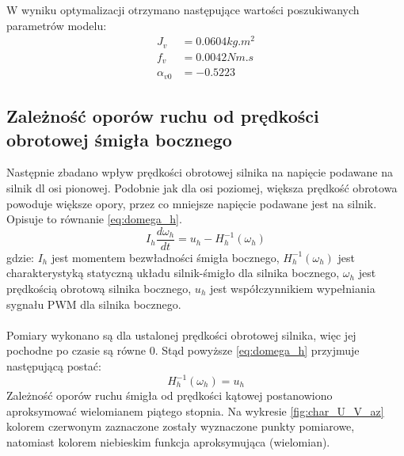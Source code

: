 \documentclass[11pt,a4paper]{article}
\begin{document}
W wyniku optymalizacji otrzymano następujące wartości poszukiwanych parametrów modelu:
\begin{equation}
\begin{aligned}
J_v &= 0.0604\si{kg.m^2}\\
f_v &= 0.0042\si{Nm.s}\\
\alpha_{v0} &= -0.5223
\end{aligned}
\end{equation}

\subsection{Zależność oporów ruchu od prędkości obrotowej śmigła bocznego}
Następnie zbadano wpływ prędkości obrotowej silnika na napięcie podawane na silnik dl osi pionowej. Podobnie jak dla osi poziomej, większa prędkość obrotowa powoduje większe opory, przez co mniejsze napięcie podawane jest na silnik. Opisuje to równanie \eqref{eq:domega_h}.
\begin{equation}
I_h\frac{d\omega_h}{dt} = u_h - H_h^{-1}(\omega_h)
\label{eq:domega_h}
\end{equation}
\noindent gdzie:\newline
\(I_h\) jest momentem bezwładności śmigła bocznego,\newline
\(H_h^{-1}(\omega_h)\) jest charakterystyką statyczną układu silnik-śmigło dla silnika bocznego,\newline
\(\omega_h\) jest prędkością obrotową silnika bocznego,\newline
\(u_h\) jest współczynnikiem wypełniania sygnału PWM dla silnika bocznego.
\paragraph*{}
Pomiary wykonano są dla ustalonej prędkości obrotowej silnika, więc jej pochodne po czasie są równe \(0\). Stąd powyższe \eqref{eq:domega_h} przyjmuje następującą postać:
\begin{equation}
H_h^{-1}(\omega_h) = u_h
\end{equation}
Zależność oporów ruchu śmigła od prędkości kątowej postanowiono aproksymować wielomianem piątego stopnia. Na wykresie \ref{fig:char_U_V_az} kolorem czerwonym zaznaczone zostały wyznaczone punkty pomiarowe, natomiast kolorem niebieskim funkcja aproksymująca (wielomian).
\end{document}

